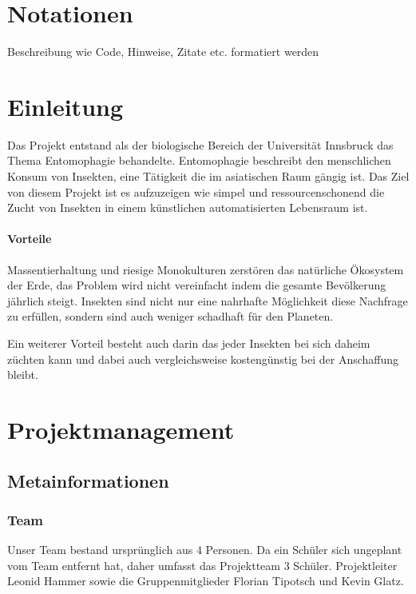 \def \currentAuthor {} %

\chapter*{Notationen}
Beschreibung wie Code, Hinweise, Zitate etc. formatiert werden  

\chapter{Einleitung}

Das Projekt entstand als der biologische Bereich der Universität Innsbruck das Thema Entomophagie behandelte. Entomophagie beschreibt den menschlichen Konsum von Insekten, eine Tätigkeit die im asiatischen Raum gängig ist. Das Ziel von diesem Projekt ist es aufzuzeigen wie simpel und ressourcenschonend die Zucht von Insekten in einem künstlichen automatisierten Lebensraum ist.

\subsubsection{Vorteile}
Massentierhaltung und riesige Monokulturen zerstören das natürliche Ökosystem der Erde, das Problem wird nicht vereinfacht indem die gesamte Bevölkerung jährlich steigt. Insekten sind nicht nur eine nahrhafte Möglichkeit diese Nachfrage zu erfüllen, sondern sind auch weniger schadhaft für den Planeten.

Ein weiterer Vorteil besteht auch darin das jeder Insekten bei sich daheim züchten kann  und dabei auch vergleichsweise kostengünstig bei der Anschaffung bleibt.




\chapter{Projektmanagement}

\section{Metainformationen}

\subsection{Team}
Unser Team bestand ursprünglich aus 4 Personen. Da ein Schüler sich ungeplant vom Team entfernt hat, daher umfasst das Projektteam 3 Schüler. Projektleiter Leonid Hammer sowie die Gruppenmitglieder Florian Tipotsch und  Kevin Glatz.



